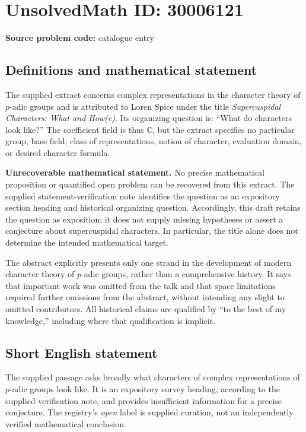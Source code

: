 \documentclass[11pt]{article}
\newcommand{\C}{\mathbb{C}}
\begin{document}
\section*{UnsolvedMath ID: 30006121}
\textbf{Source problem code:} catalogue entry
\subsection{Definitions and mathematical statement}
The supplied extract concerns complex representations in the character theory of \(p\)-adic groups and is attributed to Loren Spice under the title \emph{Supercuspidal Characters: What and How(e)}. Its organizing question is: ``What do characters look like?'' The coefficient field is thus \(\C\), but the extract specifies no particular group, base field, class of representations, notion of character, evaluation domain, or desired character formula.

\textbf{Unrecoverable mathematical statement.} No precise mathematical proposition or quantified open problem can be recovered from this extract. The supplied statement-verification note identifies the question as an expository section heading and historical organizing question. Accordingly, this draft retains the question as exposition; it does not supply missing hypotheses or assert a conjecture about supercuspidal characters. In particular, the title alone does not determine the intended mathematical target.

The abstract explicitly presents only one strand in the development of modern character theory of \(p\)-adic groups, rather than a comprehensive history. It says that important work was omitted from the talk and that space limitations required further omissions from the abstract, without intending any slight to omitted contributors. All historical claims are qualified by ``to the best of my knowledge,'' including where that qualification is implicit.
\subsection{Short English statement}
The supplied passage asks broadly what characters of complex representations of \(p\)-adic groups look like. It is an expository survey heading, according to the supplied verification note, and provides insufficient information for a precise conjecture. The registry's \emph{open} label is supplied curation, not an independently verified mathematical conclusion.
\end{document}
